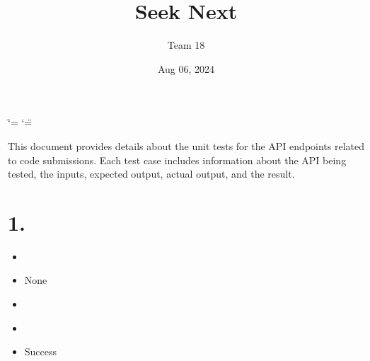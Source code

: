 \documentclass[letterpaper,10pt,english]{sphinxmanual}
\title{Seek \sphinxhyphen{} Next}
\date{Aug 06, 2024}
\author{Team 18}
\begin{document}
\ifdefined\shorthandoff
  \ifnum\catcode`\=\string=\active\shorthandoff{=}\fi
  \ifnum\catcode`\"=\active{}\fi
\fi

\pagestyle{empty}
\sphinxmaketitle
\pagestyle{plain}
\sphinxtableofcontents
\pagestyle{normal}
\label{\detokenize{src/index::doc}}
\sphinxstepscope



\sphinxAtStartPar
This document provides details about the unit tests for the API endpoints related to code submissions. Each test case includes information about the API being tested, the inputs, expected output, actual output, and the result.


\chapter{1. }
\label{\detokenize{src/codeComputing:test-case-test-read-main}}\begin{itemize}
\item {} 
\sphinxAtStartPar
{} \sphinxtitleref{/}

\item {} 
\sphinxAtStartPar
{} None

\item {} 
\sphinxAtStartPar
{}

\begin{sphinxVerbatim}[commandchars=\\\{\}]
\end{sphinxVerbatim}

\item {} 
\sphinxAtStartPar
{}

\begin{sphinxVerbatim}[commandchars=\\\{\}]
\end{sphinxVerbatim}

\item {} 
\sphinxAtStartPar
{} Success

\end{itemize}
\end{document}
